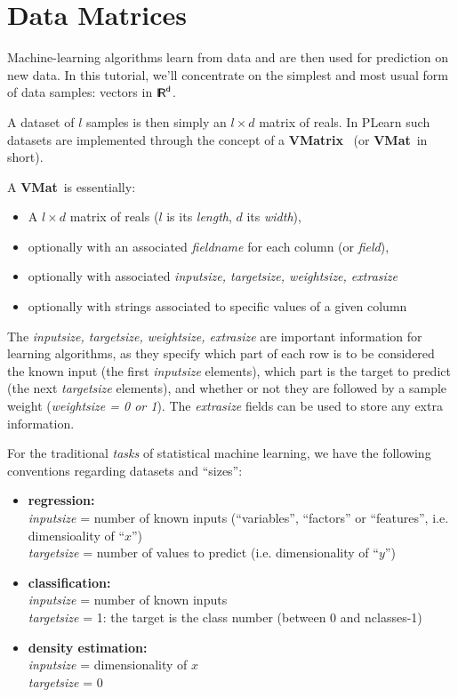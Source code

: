 \documentclass[11pt]{book}
\newcommand{\R}{\sf{I\!R}}
\newcommand{\VMatrix}{{\bf VMatrix}~}
\newcommand{\VMat}{{\bf VMat}~}
\begin{document}
\section{Data Matrices}

Machine-learning algorithms learn from data and are then used for prediction on new data.
In this tutorial, we'll concentrate on the simplest and most usual form of
data samples: vectors in $\R^d$. 

A dataset of $l$ samples is then simply an $l \times d$ matrix of reals.
In PLearn such datasets are implemented through the concept of a \VMatrix
(or \VMat in short).

A \VMat is essentially:
\begin{itemize}
\item A $l \times d$ matrix of reals ($l$ is its {\em length}, $d$ its {\em width}),
\item optionally with an associated {\em fieldname} for each column (or {\em field}),
\item optionally with associated {\em inputsize, targetsize, weightsize, extrasize}
\item optionally with strings associated to specific values of a given column
\end{itemize}

The {\em inputsize, targetsize, weightsize, extrasize} are important information for
learning algorithms, as they specify which part of each row is to be
considered the known input (the first {\em inputsize} elements), which part
is the target to predict (the next {\em targetsize} elements), and whether
or not they are followed by a sample weight ({\em weightsize = 0 or
  1}). The {\em extrasize} fields can be used to store any extra information.

For the traditional {\em tasks} of statistical machine learning, we have
the following conventions regarding datasets and ``sizes'':
\begin{itemize}
\item {\bf regression:} \\
{\em inputsize} = number of known inputs (``variables'', ``factors'' or ``features'', i.e. dimensioality of ``$x$'')\\
{\em targetsize} = number of values to predict (i.e. dimensionality of ``$y$'')
\item {\bf classification:} \\
{\em inputsize} = number of known inputs \\
{\em targetsize} = 1: the target is the class number (between 0 and nclasses-1)
\item {\bf density estimation:} \\
{\em inputsize} = dimensionality of $x$ \\
{\em targetsize} = 0
\end{itemize}
\end{document}
